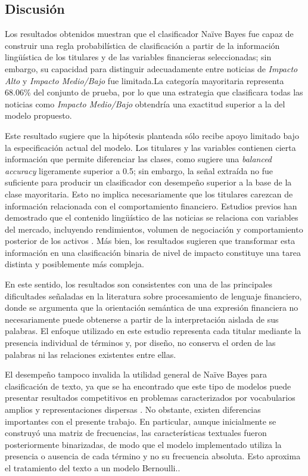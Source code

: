 \documentclass{Academic}
\begin{document}
\subsection{Discusión}

Los resultados obtenidos muestran que el clasificador Naïve Bayes fue capaz de construir una regla 
probabilística de clasificación a partir de la información lingüística de los titulares y de las variables 
financieras seleccionadas; sin embargo, su capacidad para distinguir adecuadamente entre noticias de 
\textit{Impacto Alto} y \textit{Impacto Medio/Bajo} fue limitada.La categoría mayoritaria representa 68.06\% del 
conjunto de prueba, por lo que una estrategia que clasificara todas las noticias como \textit{Impacto Medio/Bajo} 
obtendría una exactitud superior a la del modelo propuesto.

Este resultado sugiere que la hipótesis planteada sólo recibe apoyo limitado bajo la especificación 
actual del modelo. Los titulares y las variables contienen cierta información que permite 
diferenciar las clases, como sugiere una \textit{balanced accuracy} ligeramente superior a 0.5; sin embargo, 
la señal extraída no fue suficiente para producir un clasificador con desempeño superior a la base de la 
clase mayoritaria. Esto no implica necesariamente que los titulares carezcan de información relacionada con el 
comportamiento financiero. Estudios previos han demostrado que el contenido lingüístico de las noticias se 
relaciona con variables del mercado, incluyendo rendimientos, volumen de negociación y comportamiento posterior 
de los activos \cite{tetlock2007media,tetlock2008more,heston2017news}. Más bien, los resultados sugieren que 
transformar esta información en una clasificación binaria de nivel de impacto constituye una tarea distinta y 
posiblemente más compleja.

En este sentido, los resultados son consistentes con una de las principales dificultades señaladas 
en la literatura sobre procesamiento de lenguaje financiero, donde se argumenta 
que la orientación semántica de una expresión financiera no necesariamente puede obtenerse a partir de la 
interpretación aislada de sus palabras.\cite{malo2014good} El enfoque utilizado en este estudio representa cada titular mediante 
la presencia individual de términos y, por diseño, no conserva el orden de las palabras ni las relaciones 
existentes entre ellas.

El desempeño tampoco invalida la utilidad general de Naïve Bayes para clasificación de texto, ya que 
se ha encontrado que este tipo de modelos puede presentar 
resultados competitivos en problemas caracterizados por vocabularios amplios y representaciones dispersas \cite{mccallum1998comparison}. 
No obstante, existen diferencias importantes con el presente trabajo. En particular, aunque inicialmente 
se construyó una matriz de frecuencias, las características textuales fueron posteriormente binarizadas, 
de modo que el modelo implementado utiliza la presencia o ausencia de cada término y no su frecuencia absoluta. 
Esto aproxima el tratamiento del texto a un modelo Bernoulli..
\end{document}
